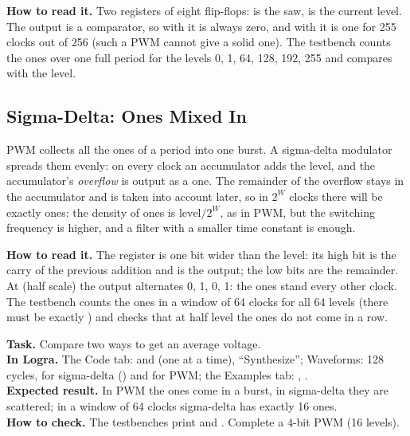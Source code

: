 
\textbf{How to read it.} Two registers of eight flip-flops:  is the saw,
 is the current level. The output  is a comparator, so with
 it is always zero, and with  it is one for 255
clocks out of 256 (such a PWM cannot give a solid one). The testbench
 counts the ones over one full period for the levels 0, 1, 64,
128, 192, 255 and compares with the level.

\subsection{Sigma-Delta: Ones Mixed In}

PWM collects all the ones of a period into one burst. A sigma-delta modulator
spreads them evenly: on every clock an accumulator adds the level, and the
accumulator's \emph{overflow} is output as a one. The remainder of the overflow
stays in the accumulator and is taken into account later, so in $2^W$ clocks
there will be exactly  ones: the density of ones is
$\text{level}/2^W$, as in PWM, but the switching frequency is higher, and a
filter with a smaller time constant is enough.


\textbf{How to read it.} The register  is one bit wider than the level:
its high bit  is the carry of the previous addition and is the
output; the low  bits are the remainder. At  (half scale)
the output alternates 0, 1, 0, 1: the ones stand every other clock. The testbench
 counts the ones in a window of 64 clocks for all 64
levels (there must be exactly ) and checks that at half level the ones
do not come in a row.

\begin{diybox}
\textbf{Task.} Compare two ways to get an average voltage.\\
\textbf{In Logra.} The Code tab:  and  (one at a
time), ``Synthesize''; Waveforms: 128 cycles,  for sigma-delta
() and  for PWM; the Examples tab: ,
.\\
\textbf{Expected result.} In PWM the ones come in a burst, in sigma-delta they are
scattered; in a window of 64 clocks sigma-delta has exactly 16 ones.\\
\textbf{How to check.} The testbenches print  and
.  Complete a 4-bit PWM (16 levels).
\end{diybox}

